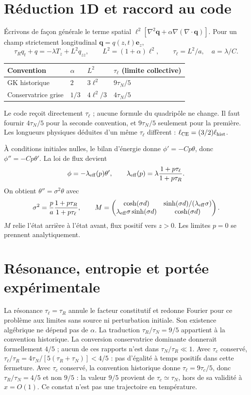 \documentclass[11pt,a4paper]{article}
\begin{document}
\section{Réduction 1D et raccord au code}
Écrivons de façon générale le terme spatial
$\ell^2[\nabla^2\mathbf q+\alpha\nabla(\nabla\cdot\mathbf q)]$.
Pour un champ strictement longitudinal $\mathbf q=q(z,t)\mathbf e_z$,
\[
 \tau_R q_t+q=-\lambda T_z+L^2 q_{zz},
 \qquad L^2=(1+\alpha)\ell^2,\qquad \tau_\ell=L^2/a,\quad a=\lambda/C.
\]
\begin{center}
\begin{tabular}{@{}llll@{}}
\toprule
Convention & $\alpha$ & $L^2$ & $\tau_\ell$ (limite collective)\\
\midrule
GK historique & $2$ & $3\ell^2$ & $9\tau_N/5$\\
Conservatrice grise & $1/3$ & $4\ell^2/3$ & $4\tau_N/5$\\
\bottomrule
\end{tabular}
\end{center}
Le code reçoit directement $\tau_\ell$ ; aucune formule du quadripôle ne change.
Il faut fournir $4\tau_N/5$ pour la seconde convention, et $9\tau_N/5$
seulement pour la première. Les longueurs physiques déduites d'un même
$\tau_\ell$ diffèrent : $\ell_{\rm CE}=(3/2)\ell_{\rm hist}$.

À conditions initiales nulles, le bilan d'énergie donne
$\phi'=-Cp\theta$, donc $\phi''=-Cp\theta'$.
La loi de flux devient
\[
 \phi=-\lambda_{\rm eff}(p)\theta',\qquad
 \lambda_{\rm eff}(p)=\lambda\frac{1+p\tau_\ell}{1+p\tau_R}.
\]
On obtient $\theta''=\sigma^2\theta$ avec
\[
 \sigma^2=\frac{p}{a}\frac{1+p\tau_R}{1+p\tau_\ell},\qquad
 M=\begin{pmatrix}
 \cosh(\sigma d)&\sinh(\sigma d)/(\lambda_{\rm eff}\sigma)\\
 \lambda_{\rm eff}\sigma\sinh(\sigma d)&\cosh(\sigma d)
 \end{pmatrix}.
\]
$M$ relie l'état arrière à l'état avant, flux positif vers $z>0$.
Les limites $p=0$ se prennent analytiquement.

\section{Résonance, entropie et portée expérimentale}
La résonance $\tau_\ell=\tau_R$ annule le facteur constitutif et redonne
Fourier pour ce problème aux limites sans source ni perturbation initiale.
Son existence algébrique ne dépend pas de $\alpha$.
La traduction $\tau_R/\tau_N=9/5$ appartient à la convention historique.
La conversion conservatrice dominante donnerait formellement $4/5$ ;
aucun de ces rapports n'est dans $\tau_N/\tau_R\ll1$.
Avec $\tau_c$ conservé, $\tau_\ell/\tau_R=
4\tau_N/[5(\tau_R+\tau_N)]<4/5$ : pas d'égalité à temps positifs
dans cette fermeture. Avec $\tau_c$ conservé, la convention historique
donne $\tau_\ell=9\tau_c/5$, donc $\tau_R/\tau_N=4/5$ et non $9/5$ :
la valeur $9/5$ provient de $\tau_c\simeq\tau_N$, hors de sa validité
à $x=O(1)$. Ce constat n'est pas une trajectoire en température.
\end{document}
